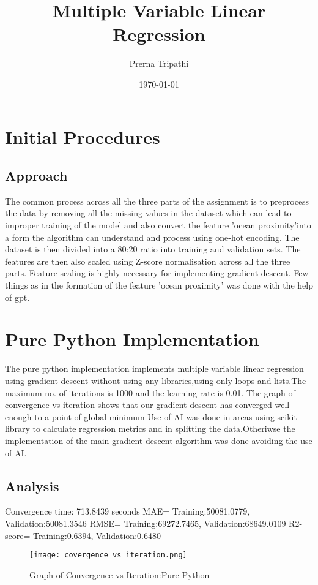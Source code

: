 \documentclass[12pt]{article}
\title{Multiple Variable Linear Regression}
\author{Prerna Tripathi}
\date{\today}
\begin{document}
\maketitle
\onehalfspacing

\section{Initial Procedures}
\subsection{Approach}
The common process across all the three parts of the assignment is to preprocess the data by removing all the missing values in the dataset which can lead to improper training of the model and also convert the feature 'ocean proximity'into a form the algorithm can understand and process using one-hot encoding.
The dataset is then divided into a 80:20 ratio into training and validation sets. The features are then also scaled using Z-score normalisation across all the three parts. Feature scaling is highly necessary for implementing gradient descent.
Few things as in the formation of the feature 'ocean proximity' was done with the help of gpt.
\section{Pure Python Implementation}
The pure python implementation implements multiple variable linear regression using gradient descent without using any libraries,using only loops and lists.The maximum no. of iterations is 1000 and the learning rate is 0.01. The graph of convergence vs iteration shows that our gradient descent has converged well enough to a point of global minimum
Use of AI was done in areas using scikit-library to calculate regression metrics and in splitting the data.Otheriwse the implementation of the main gradient descent algorithm was done avoiding the use of AI.
\subsection{Analysis}
Convergence time: 713.8439 seconds
MAE= Training:50081.0779, Validation:50081.3546
RMSE= Training:69272.7465, Validation:68649.0109
R2-score= Training:0.6394, Validation:0.6480
\begin{figure}[h]
    \centering
    \texttt{[image: covergence\_vs\_iteration.png]}
    \caption{Graph of Convergence vs Iteration:Pure Python}
    \label{fig:Convergence vs Iteration}
\end{figure}
\end{document}
